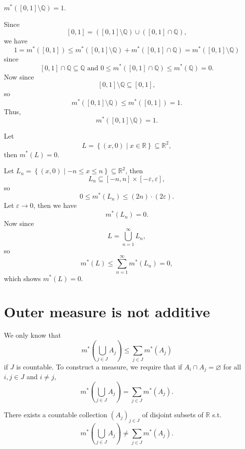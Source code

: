 \begin{claim}
    \(m^* ([0, 1] \setminus \mathbb{Q} ) = 1\). 
\end{claim}
\begin{explanation}
    Since 
    \[
        [0, 1] = ([0, 1] \setminus \mathbb{Q} ) \cup ([0, 1] \cap \mathbb{Q}),
    \]
    we have 
    \[
        1 = m^*([0, 1]) \le m^*([0, 1] \setminus \mathbb{Q} ) + m^* ([0, 1] \cap \mathbb{Q} ) = m^*([0, 1] \setminus \mathbb{Q} )
    \]
    since 
    \[
        [0, 1] \cap \mathbb{Q} \subseteq \mathbb{Q} \text{ and } 0 \le m^*([0, 1] \cap \mathbb{Q} ) \le m^*(\mathbb{Q} ) = 0. 
    \]
    Now since 
    \[
        [0, 1] \setminus \mathbb{Q} \subseteq [0, 1],
    \]
    so 
    \[
        m^*([0, 1] \setminus \mathbb{Q} ) \le m^* ([0, 1]) = 1.
    \]
    Thus,
    \[
        m^*([0, 1] \setminus \mathbb{Q} ) = 1.
    \]
\end{explanation}

\begin{claim}
    Let 
    \[
        L = \left\{ (x, 0) \mid x \in \mathbb{R} \right\} \subseteq \mathbb{R}^2,
    \]
    then \(m^*(L) = 0\). 
\end{claim}

\begin{explanation}
    Let \(L_n = \left\{ (x, 0) \mid -n \le x \le n \right\} \subseteq \mathbb{R} ^2 \), then 
    \[
        L_n \subseteq [-n, n] \times [-\varepsilon, \varepsilon],
    \]
    so 
    \[
        0 \le m^*(L_n) \le (2n) \cdot (2 \varepsilon).
    \]
    Let \(\varepsilon \to 0\), then we have 
    \[
        m^*(L_n) = 0.
    \] 
    Now since 
    \[
        L = \bigcup_{n=1}^{\infty} L_n, 
    \]
    so 
    \[
        m^*(L) \le \sum_{n=1}^{\infty} m^*(L_n) = 0, 
    \]
    which shows \(m^*(L) = 0\). 
\end{explanation}

\section{Outer measure is not additive}
We only know that
\[
    m^* \left( \bigcup_{j \in J} A_j \right) \le \sum_{j \in J} m^*(A_j)  
\]
if \(J\) is countable. To construct a measure, we require that if \(A_i \cap A_j = \varnothing\) for all \(i, j \in J\) and \(i \neq j\),
\[
    m^* \left( \bigcup_{j \in J} A_j \right) = \sum_{j \in J} m^*(A_j). 
\]    

\begin{proposition}
    There exists a countable collection \((A_j)_{j \in J}\) of disjoint subsets of \(\mathbb{R} \) s.t. 
    \[
        m^* \left( \bigcup_{j \in J} A_j  \right) \neq \sum_{j \in J} m^*(A_j). 
    \]  
\end{proposition}

